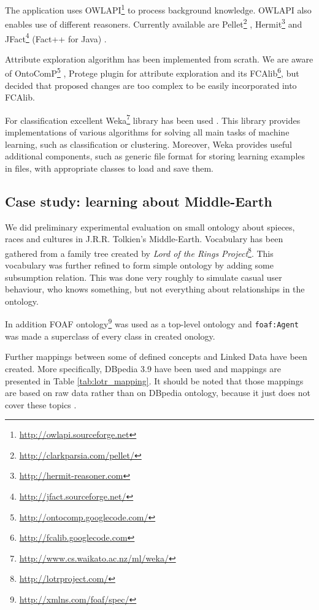 \documentclass{llncs}
\begin{document}
The application uses OWLAPI\footnote{\url{http://owlapi.sourceforge.net}}
\cite{owlapi} to process background knowledge.  OWLAPI also enables use of
different reasoners. Currently available are
Pellet\footnote{\url{http://clarkparsia.com/pellet/}}
\cite{pellet}, Hermit\footnote{\url{http://hermit-reasoner.com}} \cite{hermit}
and JFact\footnote{\url{http://jfact.sourceforge.net/}} (Fact++ for Java)
\cite{fact++}.

Attribute exploration algorithm has been implemented from scrath. We are aware
of OntoComP\footnote{\url{http://ontocomp.googlecode.com/}} \cite{ontocomp},
Protege plugin for attribute exploration and its
FCAlib\footnote{\url{http://fcalib.googlecode.com}}, but decided that proposed
changes are too complex to be easily incorporated into FCAlib.

For classification excellent
Weka\footnote{\url{http://www.cs.waikato.ac.nz/ml/weka/}} library has been used
\cite{weka}. This library provides implementations of various algorithms for
solving all main tasks of machine learning, such as classification or
clustering. Moreover, Weka provides useful additional components, such as
generic file format for storing learning examples in files, with appropriate
classes to load and save them.

\subsection{Case study: learning about Middle-Earth}

We did preliminary experimental evaluation on small ontology about spieces,
races and cultures in J.R.R. Tolkien's Middle-Earth. Vocabulary has been
gathered from a family tree created by \emph{Lord of the Rings
Project}\footnote{\url{http://lotrproject.com/}}. This vocabulary was further
refined to form simple ontology by adding some subsumption relation. This was
done very roughly to simulate casual user behaviour, who knows something, but
not everything about relationships in the ontology.

In addition FOAF
ontology\footnote{\url{http://xmlns.com/foaf/spec/}} was used as a top-level
ontology and \texttt{foaf:Agent} was made a superclass of every class in
created onology.

Further mappings between some of defined concepts and Linked Data have been
created. More specifically, DBpedia 3.9 have been used and mappings are
presented in Table \ref{tab:lotr_mapping}. It should be noted
that those mappings are based on raw data rather than on DBpedia ontology, because it just does not cover these topics \cite{dbpedia}. 
\end{document}
